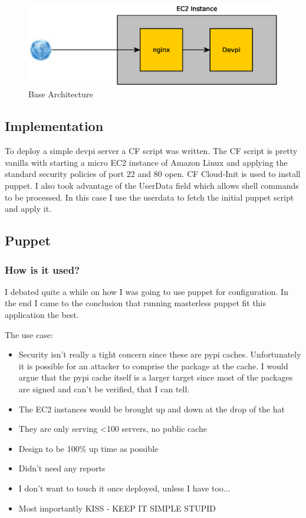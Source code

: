 \documentclass[12pt, letterpaper]{article}
\begin{document}
\begin{figure}[H]
    \caption{Base Architecture}
    \centering
    \includegraphics[width=\textwidth]{figures/base_arch.eps}
\end{figure}


\subsection{Implementation}
To deploy a simple devpi server a CF script was written. The CF script
is pretty vanilla with starting a micro EC2 instance of Amazon Linux and applying the standard security policies of
port 22 and 80 open. CF Cloud-Init is used to install puppet. I also took advantage of the UserData field which
allows shell commands to be processed. In this case I use the userdata to fetch the initial puppet script and apply it.


\subsection{Puppet}
\subsubsection{How is it used?}
I debated quite a while on how I was going to use puppet for configuration. In the end I came to the conclusion that
running masterless puppet fit this application the best.  

The use case:
\begin{itemize}
    \item Security isn't really a tight concern since these are pypi caches. Unfortunately it is possible for an attacker
        to comprise the package at the cache. I would argue that the pypi cache itself is a larger target since most of
        the packages are signed and can't be verified, that I can tell.
    \item The EC2 instances would be brought up and down at the drop of the hat
    \item They are only serving \textless 100 servers, no public cache
    \item Design to be 100\% up time as possible 
    \item Didn't need any reports
    \item I don't want to touch it once deployed, unless I have too... 
    \item Most importantly KISS - KEEP IT SIMPLE STUPID
\end{itemize}
\end{document}
